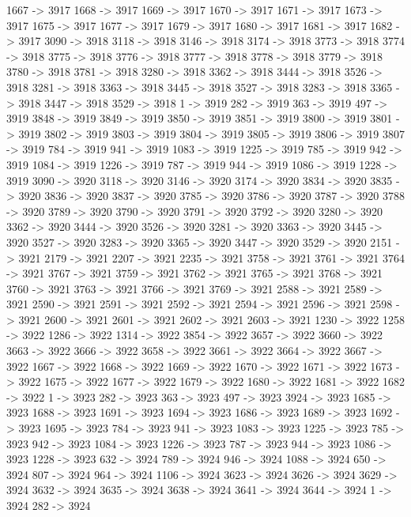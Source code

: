 {	1667 -> 3917
	1668 -> 3917
	1669 -> 3917
	1670 -> 3917
	1671 -> 3917
	1673 -> 3917
	1675 -> 3917
	1677 -> 3917
	1679 -> 3917
	1680 -> 3917
	1681 -> 3917
	1682 -> 3917
	3090 -> 3918
	3118 -> 3918
	3146 -> 3918
	3174 -> 3918
	3773 -> 3918
	3774 -> 3918
	3775 -> 3918
	3776 -> 3918
	3777 -> 3918
	3778 -> 3918
	3779 -> 3918
	3780 -> 3918
	3781 -> 3918
	3280 -> 3918
	3362 -> 3918
	3444 -> 3918
	3526 -> 3918
	3281 -> 3918
	3363 -> 3918
	3445 -> 3918
	3527 -> 3918
	3283 -> 3918
	3365 -> 3918
	3447 -> 3918
	3529 -> 3918
	1 -> 3919
	282 -> 3919
	363 -> 3919
	497 -> 3919
	3848 -> 3919
	3849 -> 3919
	3850 -> 3919
	3851 -> 3919
	3800 -> 3919
	3801 -> 3919
	3802 -> 3919
	3803 -> 3919
	3804 -> 3919
	3805 -> 3919
	3806 -> 3919
	3807 -> 3919
	784 -> 3919
	941 -> 3919
	1083 -> 3919
	1225 -> 3919
	785 -> 3919
	942 -> 3919
	1084 -> 3919
	1226 -> 3919
	787 -> 3919
	944 -> 3919
	1086 -> 3919
	1228 -> 3919
	3090 -> 3920
	3118 -> 3920
	3146 -> 3920
	3174 -> 3920
	3834 -> 3920
	3835 -> 3920
	3836 -> 3920
	3837 -> 3920
	3785 -> 3920
	3786 -> 3920
	3787 -> 3920
	3788 -> 3920
	3789 -> 3920
	3790 -> 3920
	3791 -> 3920
	3792 -> 3920
	3280 -> 3920
	3362 -> 3920
	3444 -> 3920
	3526 -> 3920
	3281 -> 3920
	3363 -> 3920
	3445 -> 3920
	3527 -> 3920
	3283 -> 3920
	3365 -> 3920
	3447 -> 3920
	3529 -> 3920
	2151 -> 3921
	2179 -> 3921
	2207 -> 3921
	2235 -> 3921
	3758 -> 3921
	3761 -> 3921
	3764 -> 3921
	3767 -> 3921
	3759 -> 3921
	3762 -> 3921
	3765 -> 3921
	3768 -> 3921
	3760 -> 3921
	3763 -> 3921
	3766 -> 3921
	3769 -> 3921
	2588 -> 3921
	2589 -> 3921
	2590 -> 3921
	2591 -> 3921
	2592 -> 3921
	2594 -> 3921
	2596 -> 3921
	2598 -> 3921
	2600 -> 3921
	2601 -> 3921
	2602 -> 3921
	2603 -> 3921
	1230 -> 3922
	1258 -> 3922
	1286 -> 3922
	1314 -> 3922
	3854 -> 3922
	3657 -> 3922
	3660 -> 3922
	3663 -> 3922
	3666 -> 3922
	3658 -> 3922
	3661 -> 3922
	3664 -> 3922
	3667 -> 3922
	1667 -> 3922
	1668 -> 3922
	1669 -> 3922
	1670 -> 3922
	1671 -> 3922
	1673 -> 3922
	1675 -> 3922
	1677 -> 3922
	1679 -> 3922
	1680 -> 3922
	1681 -> 3922
	1682 -> 3922
	1 -> 3923
	282 -> 3923
	363 -> 3923
	497 -> 3923
	3924 -> 3923
	1685 -> 3923
	1688 -> 3923
	1691 -> 3923
	1694 -> 3923
	1686 -> 3923
	1689 -> 3923
	1692 -> 3923
	1695 -> 3923
	784 -> 3923
	941 -> 3923
	1083 -> 3923
	1225 -> 3923
	785 -> 3923
	942 -> 3923
	1084 -> 3923
	1226 -> 3923
	787 -> 3923
	944 -> 3923
	1086 -> 3923
	1228 -> 3923
	632 -> 3924
	789 -> 3924
	946 -> 3924
	1088 -> 3924
	650 -> 3924
	807 -> 3924
	964 -> 3924
	1106 -> 3924
	3623 -> 3924
	3626 -> 3924
	3629 -> 3924
	3632 -> 3924
	3635 -> 3924
	3638 -> 3924
	3641 -> 3924
	3644 -> 3924
	1 -> 3924
	282 -> 3924
}

